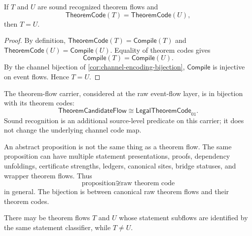 \begin{proposition}
\label{prop:theorem-generated-code-injective}
If $T$ and $U$ are sound recognized theorem flows and
$$
  \mathsf{TheoremCode}(T)=\mathsf{TheoremCode}(U),
$$
then $T=U$.
\end{proposition}

\begin{proof}
By definition, $\mathsf{TheoremCode}(T)=\mathsf{Compile}(T)$ and $\mathsf{TheoremCode}(U)=\mathsf{Compile}(U)$. Equality of theorem codes gives
$$
  \mathsf{Compile}(T)=\mathsf{Compile}(U).
$$
By the channel bijection of \autoref{cor:channel-encoding-bijection}, $\mathsf{Compile}$ is injective on event flows. Hence $T=U$.
\end{proof}

\begin{corollary}
\label{cor:theorem-generated-flow-code-bijective}
The theorem-flow carrier, considered at the raw event-flow layer, is in bijection with its theorem codes:
$$
  \mathsf{TheoremCandidateFlow}
  \cong
  \mathsf{LegalTheoremCode}_{01}.
$$
Sound recognition is an additional source-level predicate on this carrier; it does not change the underlying channel code map.
\end{corollary}

\begin{remark}
\label{rem:theorem-generated-proposition-not-flow}
An abstract proposition is not the same thing as a theorem flow. The same proposition can have multiple statement presentations, proofs, dependency unfoldings, certificate strengths, ledgers, canonical sites, bridge statuses, and wrapper theorem flows. Thus
$$
  \text{proposition}
  \not\cong
  \text{raw theorem code}
$$
in general. The bijection is between canonical raw theorem flows and their theorem codes.
\end{remark}

\begin{proposition}
\label{prop:theorem-generated-same-statement-multiple-flows}
There may be theorem flows $T$ and $U$ whose statement subflows are identified by the same statement classifier, while $T\neq U$.
\end{proposition}

